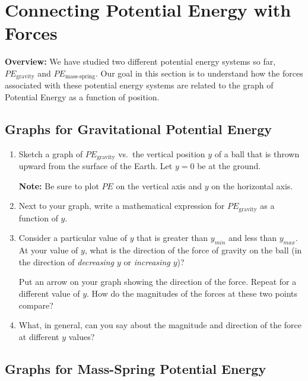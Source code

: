 \section{Connecting Potential Energy with Forces}
\label{act2.4.1}

\begin{overview}

\textbf{Overview:} We have studied two different potential energy systems so far,  $PE_\text{gravity}$ and $PE_\text{mass-spring}$. Our goal in this section is to understand how the forces associated with these potential energy systems are related to the graph of Potential Energy as a function of position.

\end{overview}

\subsection{Graphs for Gravitational Potential Energy}
\label{act2.4.1-1}

\begin{enumerate}
	\item Sketch a graph of $PE_\text{gravity}$ vs.\ the vertical position $y$ of a ball that is thrown upward from the surface of the Earth. Let $y = 0$ be at the ground.
	
		\textbf{Note:} Be sure to plot $PE$ on the vertical axis and $y$ on the horizontal axis.
	
	\item Next to your graph, write a mathematical expression for $PE_\text{gravity}$ as a function of $y$.
	
	\item Consider a particular value of $y$ that is greater than $y_{min}$ and less than $y_{max}$. At your value of $y$, what is the direction of the force of gravity on the ball (in the direction of \emph{decreasing $y$} or \emph{increasing $y$})?
	
		Put an arrow on your graph showing the direction of the force. Repeat for a different value of $y$. How do the magnitudes of the forces at these two points compare?
	
	\item What, in general, can you say about the magnitude and direction of the force at different $y$ values?
\end{enumerate}

\subsection{Graphs for Mass-Spring Potential Energy}
\label{act2.4.1-2}

